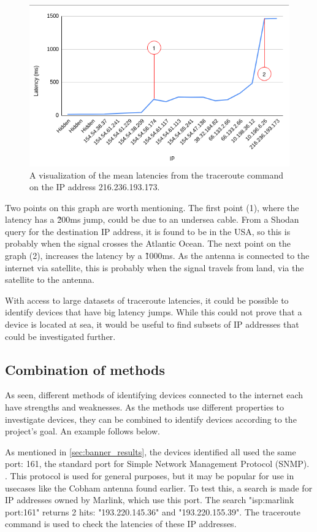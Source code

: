 \begin{figure} [H]
    \centering
    \includegraphics[scale=0.7]{Figurer/latency_graph_marked.png}
    \caption{A visualization of the mean latencies from the traceroute command on the IP address 216.236.193.173.}
    \label{fig:traceroute_graph}
\end{figure}

Two points on this graph are worth mentioning. The first point (1), where the latency has a \~200ms jump, could be due to an undersea cable. From a Shodan query for the destination IP address, it is found to be in the USA, so this is probably when the signal crosses the Atlantic Ocean. The next point on the graph (2), increases the latency by a \~1000ms. As the antenna is connected to the internet via satellite, this is probably when the signal travels from land, via the satellite to the antenna.

With access to large datasets of traceroute latencies, it could be possible to identify devices that have big latency jumps. While this could not prove that a device is located at sea, it would be useful to find subsets of IP addresses that could be investigated further.

\subsection{Combination of methods} \label{sec:combo}
As seen, different methods of identifying devices connected to the internet each have strengths and weaknesses. As the methods use different properties to investigate devices, they can be combined to identify devices according to the project's goal. An example follows below.

As mentioned in \cref{sec:banner_results}, the devices identified all used the same port: 161, the standard port for Simple Network Management Protocol (SNMP). \cite{www_ports}. This protocol is used for general purposes, but it may be popular for use in usecases like the Cobham antenna found earlier. To test this, a search is made for IP addresses owned by Marlink, which use this port. The search "isp:marlink port:161" returns 2 hits: "193.220.145.36" and "193.220.155.39". The traceroute command is used to check the latencies of these IP addresses.

